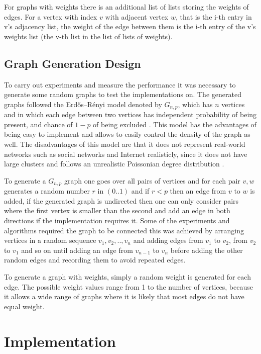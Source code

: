 \documentclass{report}
\theoremstyle{plain}
\theoremstyle{definition}
\theoremstyle{remark}
\begin{document}
For graphs with weights there is an additional list of lists storing the weights of edges. For a vertex with index $v$ with adjacent vertex $w$, that is the i-th entry in v's adjacency list, the weight of the edge between them is the i-th entry of the v's weights list (the v-th list in the list of lists of weights).

\subsection{Graph Generation Design}

To carry out experiments and measure the performance it was necessary to generate some random graphs to test the implementations on. The generated graphs followed the Erdős–Rényi model denoted by $G_{n,p}$, which has $n$ vertices and in which each edge between two vertices has independent probability of being present, and chance of $1-p$ of being excluded \cite{newman20062}. This model has the advantages of being easy to implement and allows to easily control the density of the graph as well. The disadvantages of this model are that it does not represent real-world networks such as social networks and Internet realisticly, since it does not have large clusters and follows an unrealistic Poissonian degree distribution \cite{newman20062}.

To generate a $G_{n,p}$ graph one goes over all pairs of vertices and for each pair $v,w$ generates a random number $r$ in $(0..1)$ and if $r < p$ then an edge from $v$ to $w$ is added, if the generated graph is undirected then one can only consider pairs where the first vertex is smaller than the second and add an edge in both directions if the implementation requires it. Some of the experiments and algorithms required the graph to be connected this was achieved by arranging vertices in a random sequence $v_1,v_2,..,v_n$ and adding edges from $v_1$ to $v_2$, from $v_2$ to $v_1$ and so on until adding an edge from $v_{n-1}$ to $v_n$  before adding the other random edges and recording them to avoid repeated edges.

To generate a graph with weights, simply a random weight is generated for each edge. The possible weight values range from 1 to the number of vertices, because it allows a wide range of graphs where it is likely that most edges do not have equal weight.

\section{Implementation}
\end{document}
